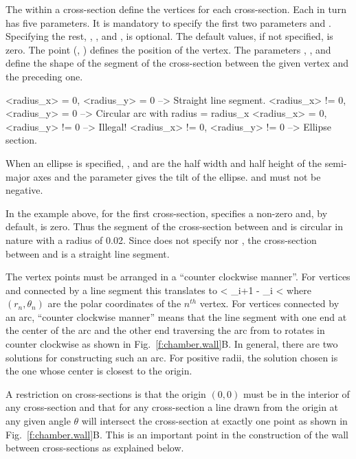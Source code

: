The  within a cross-section define the vertices
for each cross-section. Each  in turn has five
parameters. It is mandatory to specify the first two parameters
 and . Specifying the rest, ,
, and , is optional. The default values, if
not specified, is zero. The point (, ) defines the
position of the vertex. The parameters ,
, and  define the shape of the segment of
the cross-section between the given vertex and the preceding one.
\begin{example}
  <radius_x>  = 0, <radius_y>  = 0   --> Straight line segment.
  <radius_x> != 0, <radius_y>  = 0   --> Circular arc with radius = radius_x
  <radius_x>  = 0, <radius_y> != 0   --> Illegal!
  <radius_x> != 0, <radius_y> != 0   --> Ellipse section.
\end{example}
When an ellipse is specified, , and  are
the half width and half height of the semi-major axes and the
 parameter gives the tilt of the ellipse. 
and  must not be negative.

In the example above, for the first cross-section, 
specifies a non-zero  and, by default, 
is zero. Thus the segment of the cross-section between  and
 is circular in nature with a radius of 0.02. Since 
does not specify  nor , the
cross-section between  and  is a straight line
segment.

The vertex points must be arranged in a ``counter clockwise manner''. 
For vertices  and  connected by a line segment
this translates to
 < \theta_{i+1} - \theta_{i} \pmod{2\pi} < \pi
\Endeq
where $(r_n, \theta_n)$ are the polar coordinates of the $n^{th}$
vertex. For vertices connected by an arc, ``counter clockwise manner''
means that the line segment with one end at the center of the arc and
the other end traversing the arc from  to 
rotates in counter clockwise as shown in
Fig.~\ref{f:chamber.wall}B. In general, there are two solutions for
constructing such an arc. For positive radii, the solution chosen is
the one whose center is closest to the origin.  

A restriction on cross-sections is that the origin $(0,0)$ must be in the
interior of any cross-section and that for any cross-section a line
drawn from the origin at any given angle $\theta$ will intersect the
cross-section at exactly one point as shown in
Fig.~\ref{f:chamber.wall}B. This is an important point in the
construction of the wall between cross-sections as explained
below.

